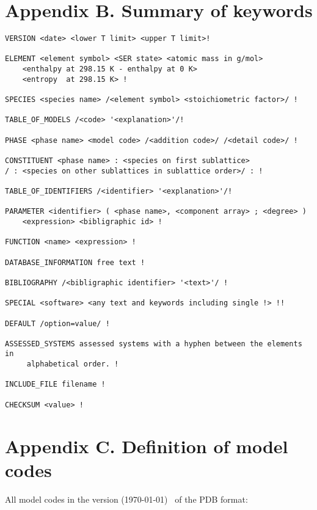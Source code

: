 \documentclass[12pt]{article}
\begin{document}
\newpage

\section{Appendix B.  Summary of keywords}

\begin{verbatim}
VERSION <date> <lower T limit> <upper T limit>!

ELEMENT <element symbol> <SER state> <atomic mass in g/mol>
    <enthalpy at 298.15 K - enthalpy at 0 K>
    <entropy  at 298.15 K> !

SPECIES <species name> /<element symbol> <stoichiometric factor>/ !

TABLE_OF_MODELS /<code> '<explanation>'/!

PHASE <phase name> <model code> /<addition code>/ /<detail code>/ !

CONSTITUENT <phase name> : <species on first sublattice> 
/ : <species on other sublattices in sublattice order>/ : !

TABLE_OF_IDENTIFIERS /<identifier> '<explanation>'/!

PARAMETER <identifier> ( <phase name>, <component array> ; <degree> )
    <expression> <bibligraphic id> !

FUNCTION <name> <expression> !

DATABASE_INFORMATION free text !

BIBLIOGRAPHY /<bibligraphic identifier> '<text>'/ !

SPECIAL <software> <any text and keywords including single !> !!

DEFAULT /option=value/ !

ASSESSED_SYSTEMS assessed systems with a hyphen between the elements in
     alphabetical order. !

INCLUDE_FILE filename !

CHECKSUM <value> !

\end{verbatim}

\newpage

\section{Appendix C.  Definition of model codes}

All model codes in the version (\today) ~of the PDB format:
\end{document}
